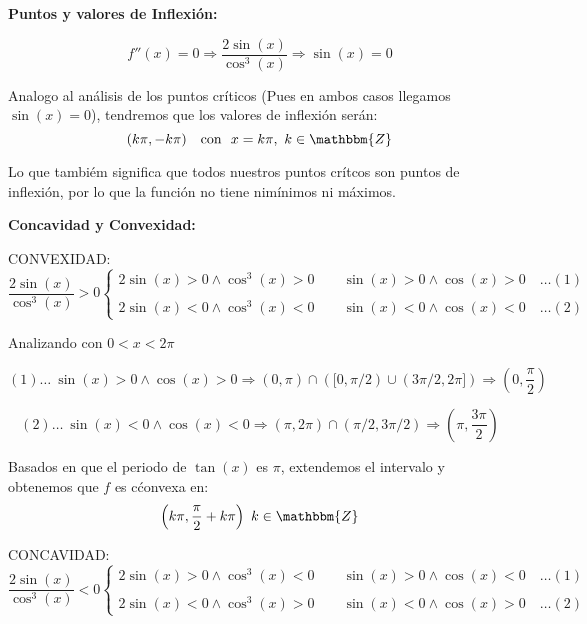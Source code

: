 \documentclass[12pt]{article}
\begin{document}
\begin{enumerate}[\hspace{9px} a)]
        \textbf{Puntos y valores de Inflexi\'on: }\medskip

            \begin{equation*}
                f''(x)=0 \Longrightarrow \frac{2\sin(x)}{\cos^3(x)} \Longrightarrow \sin(x)=0
            \end{equation*}

            Analogo al an\'alisis de los puntos cr\'iticos (Pues en ambos casos llegamos \(\sin(x)=0\)), tendremos que los valores de inflexi\'on ser\'an:
            \[(k\pi,-k\pi) \quad \text{con } \  x=k\pi, \ k\in\mathbbm{Z}\]

            Lo que tambi\'em significa que todos nuestros puntos cr\'itcos son puntos de inflexi\'on, por lo que la funci\'on no tiene nim\'inimos ni m\'aximos.

        \textbf{Concavidad y Convexidad: }\medskip

        CONVEXIDAD:
        \begin{equation*}
            \frac{2\sin(x)}{\cos^3(x)}>0 
            \begin{cases}
                2\sin(x)>0 \wedge \cos^3(x)>0 \qquad \sin(x)>0 \wedge \cos(x)>0 \quad \dots (1)\\ \\
                2\sin(x)<0 \wedge \cos^3(x)<0 \qquad \sin(x)<0 \wedge \cos(x)<0 \quad \dots (2)
            \end{cases}
        \end{equation*}

        Analizando con \(0<x<2\pi\)

        \begin{equation*}
            (1) \dots \ \sin(x)>0 \wedge \cos(x)>0 \Longrightarrow (0,\pi) \cap ([0,\pi/2) \cup (3\pi/2,2\pi]) \Longrightarrow \left(0,\frac{\pi}{2}\right)
        \end{equation*}

        \begin{equation*}
            (2) \dots \ \sin(x)<0 \wedge \cos(x)<0 \Longrightarrow (\pi,2\pi) \cap (\pi/2,3\pi/2) \Longrightarrow \left(\pi,\frac{3\pi}{2}\right)
        \end{equation*}

        Basados en que el periodo de \(\tan(x)\) es $\pi$, extendemos el intervalo y obtenemos que $f$ es c\'convexa en:
        \[\left(k\pi,\frac{\pi}{2}+k\pi\right) \ k\in\mathbbm{Z}\]

        CONCAVIDAD:
        \begin{equation*}
            \frac{2\sin(x)}{\cos^3(x)}<0 
            \begin{cases}
                2\sin(x)>0 \wedge \cos^3(x)<0 \qquad \sin(x)>0 \wedge \cos(x)<0 \quad \dots (1)\\ \\
                2\sin(x)<0 \wedge \cos^3(x)>0 \qquad \sin(x)<0 \wedge \cos(x)>0 \quad \dots (2)
            \end{cases}
        \end{equation*}


\end{enumerate}
\end{document}
